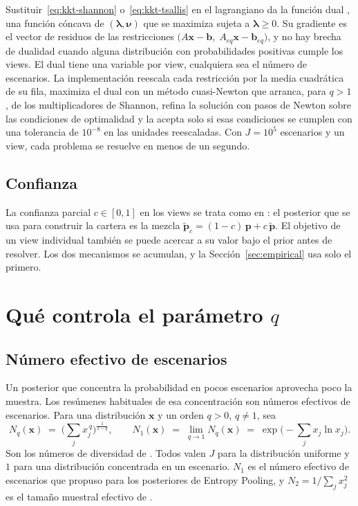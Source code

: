 \documentclass[11pt]{article}
\newcommand{\p}{\mathbf{p}}
\newcommand{\pt}{\tilde{\mathbf{p}}}
\newcommand{\x}{\mathbf{x}}
\begin{document}
Sustituir~\eqref{eq:kkt-shannon} o~\eqref{eq:kkt-tsallis} en el
lagrangiano da la funci\'on dual \citep{BorweinLewis1991}, una funci\'on
c\'oncava de $(\boldsymbol{\lambda}, \boldsymbol{\nu})$ que se maximiza
sujeta a $\boldsymbol{\lambda} \ge 0$. Su gradiente es el vector de
residuos de las restricciones
$\big(A\x - \mathbf{b},\; A_{eq}\x - \mathbf{b}_{eq}\big)$, y no hay brecha de
dualidad cuando alguna distribuci\'on con probabilidades positivas cumple los
views. El dual tiene una variable por view, cualquiera sea el n\'umero de
escenarios. La implementaci\'on reescala cada restricci\'on por la media
cuadr\'atica de su fila, maximiza el dual con un m\'etodo cuasi-Newton
que arranca, para $q>1$, de los multiplicadores de Shannon, refina la
soluci\'on con pasos de Newton sobre las condiciones de optimalidad y la
acepta solo si esas condiciones se cumplen con una tolerancia de $10^{-8}$
en las unidades reescaladas. Con $J = 10^5$ escenarios y un view, cada
problema se resuelve en menos de un segundo.

\subsection{Confianza}

La confianza parcial $c \in [0,1]$ en los views se trata como en \citet{Meucci2008}:
el posterior que se usa para construir la cartera es la mezcla
$\pt_c = (1-c)\,\p + c\,\pt$. El objetivo de un view individual tambi\'en se
puede acercar a su valor bajo el prior antes de resolver. Los dos
mecanismos se acumulan, y la Secci\'on~\ref{sec:empirical} usa solo el
primero.

\section{Qu\'e controla el par\'ametro \texorpdfstring{$q$}{q}}\label{sec:optimalq}

\subsection{N\'umero efectivo de escenarios}

Un posterior que concentra la probabilidad en pocos escenarios aprovecha poco
la muestra. Los res\'umenes habituales de esa concentraci\'on son n\'umeros
efectivos de escenarios. Para una distribuci\'on $\x$ y un orden $q>0$,
$q \ne 1$, sea
\begin{equation}\label{eq:hill}
N_q(\x) \;=\; \Big( \sum_{j} x_j^{\,q} \Big)^{\frac{1}{1-q}},
\qquad
N_1(\x) \;=\; \lim_{q \to 1} N_q(\x) \;=\; \exp\!\Big( -\sum_j x_j \ln x_j \Big).
\end{equation}
Son los n\'umeros de diversidad de \citet{Hill1973}. Todos valen $J$ para la
distribuci\'on uniforme y $1$ para una distribuci\'on concentrada en un
escenario. $N_1$ es el n\'umero efectivo de escenarios que
\citet{Meucci2012} propuso para los posteriores de Entropy Pooling, y
$N_2 = 1/\sum_j x_j^2$ es el tama\~no muestral efectivo de \citet{Kish1965}.
\end{document}
